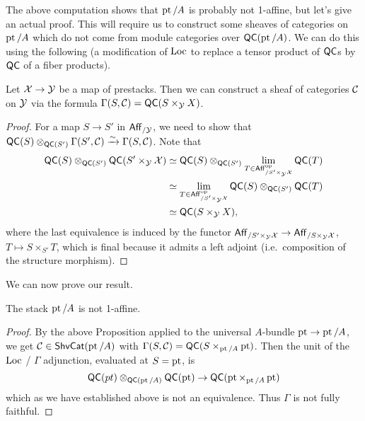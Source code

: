 \documentclass{article}
\begin{document}
The above computation shows that $\operatorname{pt} / A$ is probably not 1-affine, but let's give an actual proof.
This will require us to construct some sheaves of categories on $\operatorname{pt} / A$ which do not come from module categories over $\mathsf{QC}(\operatorname{pt} / A)$.
We can do this using the following (a modification of $\operatorname{Loc}$ to replace a tensor product of $\mathsf{QC}$s by $\mathsf{QC}$ of a fiber products).

\begin{prop}
	Let $\mathcal{X} \to \mathcal{Y}$ be a map of prestacks.
	Then we can construct a sheaf of categories $\mathcal{C}$ on $\mathcal{Y}$ via the formula $\Gamma(S, \mathcal{C}) = \mathsf{QC}(S \times_{\mathcal{Y}} X)$.
\end{prop}

\begin{proof}
	For a map $S \to S'$ in $\mathsf{Aff}_{/\mathcal{Y}}$, we need to show that $\mathsf{QC}(S) \otimes_{\mathsf{QC}(S')} \Gamma(S', \mathcal{C}) \xrightarrow{\sim} \Gamma(S, \mathcal{C})$.
	Note that
	\begin{align*}
		\mathsf{QC}(S) \otimes_{\mathsf{QC}(S')} \mathsf{QC}(S' \times_{\mathcal{Y}} \mathcal{X}) &\simeq \mathsf{QC}(S) \otimes_{\mathsf{QC}(S')} \lim_{T \in \mathsf{Aff}_{/S' \times_{\mathcal{Y}} \mathcal{X}}^{\mathrm{op}}} \mathsf{QC}(T) \\
		&\simeq \lim_{T \in \mathsf{Aff}_{/S' \times_{\mathcal{Y}} \mathcal{X}}^{\mathrm{op}}} \mathsf{QC}(S) \otimes_{\mathsf{QC}(S')} \mathsf{QC}(T) \\
		&\simeq \mathsf{QC}(S \times_{\mathcal{Y}} X),
	\end{align*}
	where the last equivalence is induced by the functor $\mathsf{Aff}_{/ S' \times_{\mathcal{Y}} \mathcal{X}} \to \mathsf{Aff}_{/ S \times_{\mathcal{Y}} \mathcal{X}}$, $T \mapsto S \times_{S'} T$, which is final because it admits a left adjoint (i.e.\ composition of the structure morphism).
\end{proof}

We can now prove our result.

\begin{thm}
	The stack $\operatorname{pt} / A$ is not 1-affine.
\end{thm}

\begin{proof}
	By the above Proposition applied to the universal $A$-bundle $\operatorname{pt} \to \operatorname{pt} / A$, we get $\mathcal{C} \in \mathsf{ShvCat}(\operatorname{pt} / A)$ with $\Gamma(S, \mathcal{C}) = \mathsf{QC}(S \times_{\operatorname{pt} / A} \operatorname{pt})$.
	Then the unit of the $\operatorname{Loc}$ / $\Gamma$ adjunction, evaluated at $S = \operatorname{pt}$, is
	\[
		\mathsf{QC}(pt) \otimes_{\mathsf{QC}(\operatorname{pt} / A)} \mathsf{QC}(\operatorname{pt}) \to \mathsf{QC}(\operatorname{pt} \times_{\operatorname{pt} / A} \operatorname{pt})
	\]
	which as we have established above is not an equivalence.
	Thus $\Gamma$ is not fully faithful.
\end{proof}
\end{document}
